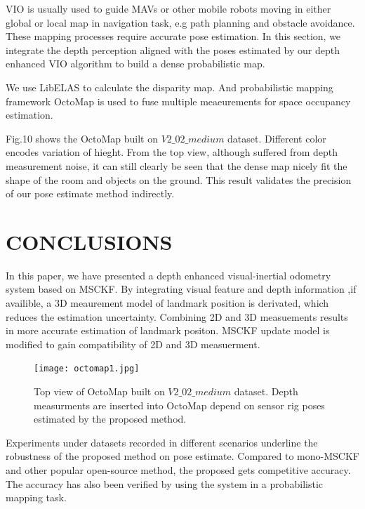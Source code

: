 \documentclass[a4paper, 10pt, conference]{ieeeconf}      %
\begin{document}
 VIO is usually used to guide MAVs or other mobile robots moving in either global or local map in navigation task, e.g path planning and obstacle avoidance. These mapping processes require accurate pose estimation. In this section, we integrate the depth perception aligned with the poses estimated by our depth enhanced VIO algorithm to build a dense probabilistic map.


We use LibELAS\cite{geiger2010efficient} to calculate the disparity map. And probabilistic mapping framework OctoMap\cite{hornung2013octomap} is used to fuse multiple meaeurements for space occupancy estimation.



 Fig.10  shows the OctoMap built on $ V2\_02\_medium$ dataset. Different color encodes  variation of hieght. From the top view, although suffered from  depth measurement noise, it can still clearly be seen that the dense map nicely fit the shape of the room and objects on the  ground. This result  validates the precision of our pose estimate method indirectly.





\section{CONCLUSIONS}
In this paper, we have presented a depth enhanced   visual-inertial odometry system based on MSCKF. By integrating visual feature and depth information ,if availible, a 3D meaurement model of landmark position  is derivated, which reduces the estimation uncertainty.  Combining 2D and 3D measuements results in  more   accurate estimation of landmark positon. MSCKF update model is modified to gain compatibility of 2D and 3D measuerment.
\begin{figure}[thpb]
	\centering
	
	\texttt{[image: octomap1.jpg]}
	
	\caption{Top view of OctoMap built on $ V2\_02\_medium$ dataset. Depth measurments are inserted into OctoMap depend on sensor rig poses estimated by the proposed method.}
	\label{figurelabel}
\end{figure}
Experiments under datasets recorded in different scenarios underline the robustness of the proposed method on pose estimate. Compared to mono-MSCKF and other popular open-source method, the proposed gets competitive accuracy. The accuracy  has also been verified by using the system in a probabilistic mapping task.
\end{document}
